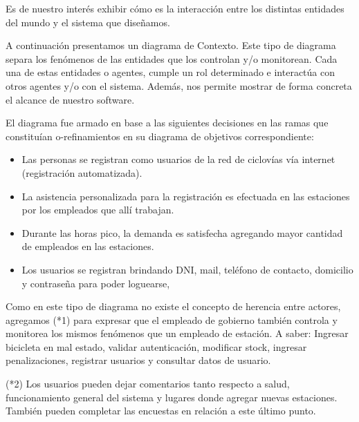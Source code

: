 Es de nuestro interés exhibir cómo es la interacción entre los distintas entidades del mundo y el sistema que diseñamos.

A continuación presentamos un diagrama de Contexto. Este tipo de diagrama separa los fenómenos de las entidades que los controlan y/o monitorean. Cada una de estas entidades o agentes, cumple un rol determinado e interactúa con otros agentes y/o con el sistema. Además, nos permite mostrar de forma concreta el alcance de nuestro software.

El  diagrama fue armado en base a las siguientes decisiones en las ramas que constituían o-refinamientos en su diagrama de objetivos correspondiente:

\begin{itemize}
\item Las personas se registran como usuarios de la red de ciclovías vía internet (registración automatizada).
\item La asistencia personalizada para la registración es efectuada en las estaciones por los empleados que allí trabajan.
\item Durante las horas pico, la demanda es satisfecha agregando mayor cantidad de empleados en las estaciones.
\item Los usuarios se registran brindando DNI, mail, teléfono de contacto, domicilio y contraseña para poder loguearse, 
\end{itemize}

Como en este tipo de diagrama no existe el concepto de herencia entre actores, agregamos (*1) para expresar que el
empleado de gobierno también controla y monitorea los mismos fenómenos que un empleado de estación. A saber:
Ingresar bicicleta en mal estado, validar autenticación, modificar stock, ingresar penalizaciones, registrar usuarios y consultar datos de usuario.

(*2) Los usuarios pueden dejar comentarios tanto respecto a salud, funcionamiento general del sistema y lugares donde agregar nuevas estaciones.
También pueden completar las encuestas en relación a este último punto.

